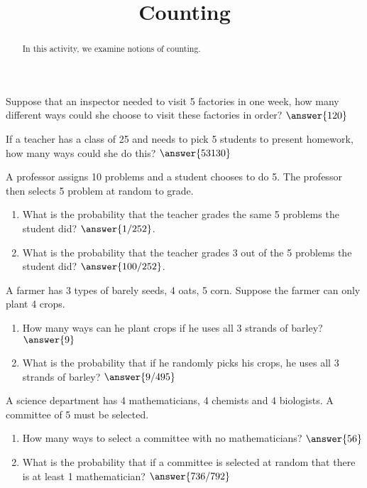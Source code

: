 \documentclass{ximera}
\title{Counting}
\begin{document}
      
\begin{abstract}
      
In this activity, we examine notions of counting.

      
\end{abstract}
      
\maketitle
 
\begin{problem}
Suppose that an inspector needed to visit 5 factories in one week, how many different ways could she choose to visit these factories in order? $\answer{120}$
\end{problem}

\begin{problem}
If a teacher has a class of 25 and needs to pick 5 students to present homework, how many ways could she do this? $\answer{53130}$
\end{problem}

\begin{problem}
A professor assigns 10 problems and a student chooses to do 5.  The professor then selects 5 problem at random to grade.

\begin{enumerate}
\item What is the probability that the teacher grades the same 5 problems the student did?  $\answer{1/252}$.
\item What is the probability that the teacher grades 3 out of the  5 problems the student did?  $\answer{100/252}$.
\end{enumerate}

\end{problem}

\begin{problem}
A farmer has 3 types of barely seeds, 4 oats, 5 corn.  Suppose the farmer can only plant 4 crops.

\begin{enumerate}
\item How many ways can he plant crops if he uses all 3 strands of barley? $\answer{9}$
\item What is the probability that if he randomly picks his crops, he uses all 3 strands of barley? $\answer{9/495}$
\end{enumerate}


\end{problem}

\begin{problem}
A  science department has 4 mathematicians, 4 chemists and 4 biologists.  A committee of 5 must be selected.

\begin{enumerate}
\item How many ways to select a committee with no mathematicians? $\answer{56}$
\item What is the probability that if a committee is selected at random that there is at least 1 mathematician? $\answer{736/792}$
\end{enumerate}


\end{problem}
\end{document}

